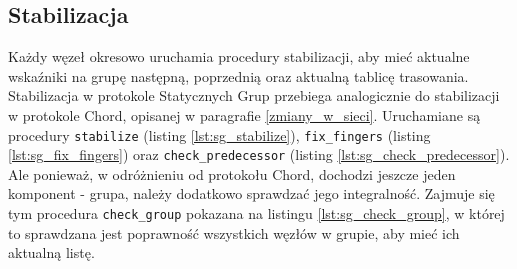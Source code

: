 \documentclass[12pt, twoside, openany]{report}
\begin{document}





\subsection{Stabilizacja}

Każdy węzeł okresowo uruchamia procedury stabilizacji, aby mieć aktualne wskaźniki na grupę następną, poprzednią oraz aktualną tablicę trasowania. Stabilizacja w protokole Statycznych Grup przebiega analogicznie do stabilizacji w protokole Chord, opisanej w paragrafie \ref{zmiany_w_sieci}. Uruchamiane są procedury \texttt{stabilize} (listing \ref{lst:sg_stabilize}), \texttt{fix\_fingers} (listing \ref{lst:sg_fix_fingers}) oraz \texttt{check\_predecessor} (listing \ref{lst:sg_check_predecessor}). Ale ponieważ, w odróżnieniu od protokołu Chord, dochodzi jeszcze jeden komponent - grupa, należy dodatkowo sprawdzać jego integralność. Zajmuje się tym procedura \texttt{check\_group} pokazana na listingu \ref{lst:sg_check_group}, w której to sprawdzana jest poprawność wszystkich węzłów w grupie, aby mieć ich aktualną listę.








\end{document}
